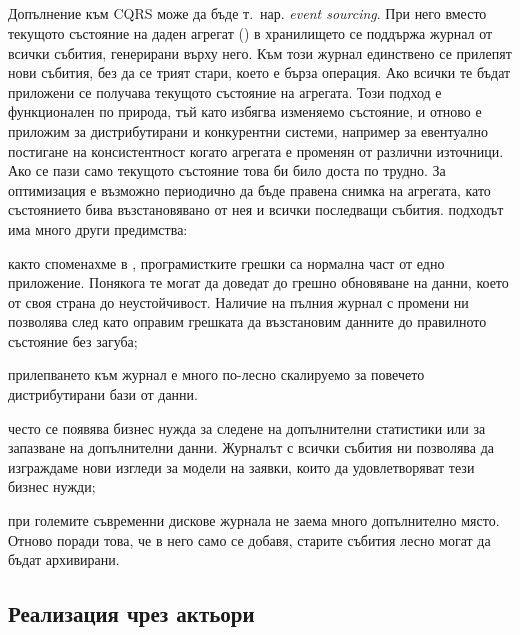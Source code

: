 \subsection{}

Допълнение към CQRS може да бъде т.~нар. \emph{event sourcing}. При него вместо текущото състояние на даден агрегат (\cite{evans2003DDD}) в хранилището се поддържа журнал от всички събития, генерирани върху него. Към този журнал единствено се прилепят нови събития, без да се трият стари, което е бърза операция. Ако всички те бъдат приложени се получава текущото състояние на агрегата. Този подход е функционален по природа, тъй като избягва изменяемо състояние, и отново е приложим за дистрибутирани и конкурентни системи, например за евентуално постигане на консистентност когато агрегата е променян от различни източници. Ако се пази само текущото състояние това би било доста по трудно. За оптимизация е възможно периодично да бъде правена снимка на агрегата, като състоянието бива възстановявано от нея и всички последващи събития.  подходът има много други предимства:

\begin{itemize*}
  \item както споменахме в , програмистките грешки са нормална част от едно приложение. Понякога те могат да доведат до грешно обновяване на данни, което от своя страна до неустойчивост. Наличие на пълния журнал с промени ни позволява след като оправим грешката да възстановим данните до правилното състояние без загуба;
  
  \item прилепването към журнал е много по-лесно скалируемо за повечето дистрибутирани бази от данни.
  
  \item често се появява бизнес нужда за следене на допълнителни статистики или за запазване на допълнителни данни. Журналът с всички събития ни позволява да изграждаме нови изгледи за модели на заявки, които да удовлетворяват тези бизнес нужди;
  
  \item при големите съвременни дискове журнала не заема много допълнително място. Отново поради това, че в него само се добавя, старите събития лесно могат да бъдат архивирани.
\end{itemize*}

\subsection{Реализация чрез актьори}


